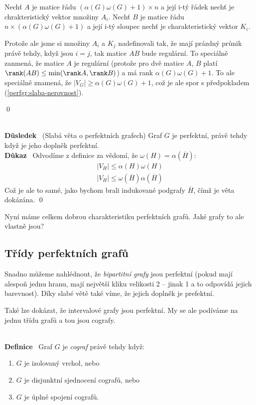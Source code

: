\documentclass{article}
\renewcommand{\paragraph}[1]{\ \\\smallskip\noindent\textbf{#1}\ }
\begin{document}
\begin{enumerate}
	Nechť $A$ je matice řádu $(\alpha(G)\omega(G) + 1)\times n$ a její i-tý 
	řádek nechť je chrakteristický vektor množiny $A_i$. Nechť $B$ je matice 
	řádu $n \times (\alpha(G)\omega(G) + 1)$ a její i-tý sloupec nechť je 
	charakteristický vektor $K_i$.

	Protože ale jsme si množiny $A_i$ a $K_j$ nadefinovali tak, že mají prázdný 
	průnik právě tehdy, když jsou $i=j$, tak matice $AB$ bude regulární. To 
	speciálně zanmená, že matice $A$ je regulární (protože pro dvě matice $A$, 
	$B$ platí $\rank(AB) \leq \min(\rank A, \rank B)$) a má rank 
	$\alpha(G)\omega(G) + 1$.  To ale speciálně znamená, že $|V_G| \geq 
	\alpha(G)\omega(G)+1$, což je ale spor s předpokladem 
	(\ref{perfgr:slaba-nerovnost}).
\end{enumerate}
\qed


\paragraph{Důsledek} (Slabá věta o perfektních grafech) Graf $G$ je perfektní, 
právě tehdy když je jeho doplněk perfektní.
\paragraph{Důkaz} Odvodíme z definice za vědomí, že $\omega(H) = 
\alpha(\overline{H})$:
\begin{align}
	|V_H| \leq \alpha(H)\omega(H)\\
	|V_H| \leq \omega(\overline H)\alpha(\overline H)
\end{align}
Což je ale to samé, jako bychom brali indukované podgrafy $\overline H$, čímž je 
věta dokázána.
\qed

Nyní máme celkem dobrou charakteristiku perfektních grafů. Jaké grafy to ale 
vlastně jsou?

\subsection{Třídy perfektních grafů}
Snadno můžeme nahlédnout, že \textit{bipartitní grafy} jsou perfektní (pokud 
mají alespoň jednu hranu, mají největší kliku velikosti 2 -- jinak 1 a to 
odpovídá jejich barevnost). Díky slabé větě také víme, že jejich doplněk je 
prefektní.

Také lze dokázat, že intervalové grafy jsou perfektní. My se ale podíváme na 
jednu třídu grafů a tou jsou cografy.

\paragraph{Definice} Graf $G$ je \textit{cograf} právě tehdy když:
\begin{enumerate}
	\item $G$ je izolovaný vrchol, nebo
	\item $G$ je disjunktní sjednocení cografů, nebo
	\item $G$ je úplné spojení cografů.
\end{enumerate}
\end{document}
